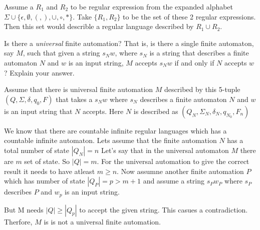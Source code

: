 \begin{solution}
  Assume a $R_{1}$ and $R_{2}$ to be regular expression from the expanded alphabet $\Sigma \cup \{\epsilon, \emptyset, (,), \cup, \circ, *\}$. Take $\{R_{1}, R_{2}\}$ to be the set of these 2 regular expressions. Then this set would describle a regular language described by $R_{1}\cup R_{2}$.
\end{solution}


\question %
Is there a \emph{universal} finite automation? That is, is there a single finite automaton, say $M$, such that given a string $s_{N}w$, where $s_{N}$ is a string that describes a finite automaton $N$ and $w$ is an input string, $M$ accepts $s_{N}w$ if and only if $N$ accepts $w$? Explain your answer.

\begin{solution}

  Assume that there is universal finite automation $M$ described by this 5-tuple $(Q,\Sigma, \delta, q_{0}, F)$ that takes a $s_{N}w$ where $s_{N}$ describes a finite automaton $N$ and $w$ is an input string that $N$ accepts. Here $N$ is described as $(Q_{N}, \Sigma_{N}, \delta_{N}, q_{N_{0}}, F_{n})$

  We know that there are countable infinite regular languages which has a countable infinite automaton. Lets assume that the finite automation $N$ has a total number of state $|Q_{N}| = n$
  Let's say that in the universal automaton $M$ there are $m$ set of state. So $|Q| = m $.
  For the universal automation to give the correct result it needs to have atleast $m \ge n$. Now assumne another finite automation $P$ which has number of state $|Q_{P}| = p > m+1$ and assume a string $s_{P}w_{P}$ where $s_{P}$ describes $P$ and $w_{p}$ is an input string.

 But M needs $|Q|\ge |Q_{p}|$ to accept the given string. This casues a contradiction. Therfore, $M$ is is not a universal finite automation.

\end{solution}
